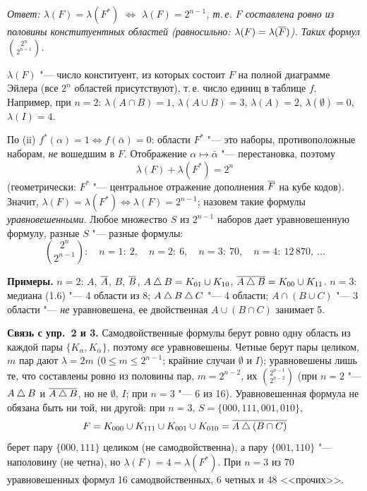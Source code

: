 \begin{solution}[7 (\S\,3)]
\emph{Ответ: $\lambda(F)=\lambda(F^*)$ $\iff$ $\lambda(F)=2^{n-1}$, т.\,е.
$F$ составлена ровно из половины конституентных областей (равносильно:
$\lambda(F)=\lambda(\overline{F})$). Таких формул $\binom{2^n}{2^{n-1}}$.}

$\lambda(F)$ "--- число конституент, из которых состоит $F$ на полной
диаграмме Эйлера (все $2^n$ областей присутствуют), т.\,е. число единиц
в таблице $f$. Например, при $n=2$: $\lambda(A\cap B)=1$,
$\lambda(A\cup B)=3$, $\lambda(A)=2$, $\lambda(\emptyset)=0$,
$\lambda(I)=4$.

По (ii) $f^*(\alpha)=1\iff f(\bar\alpha)=0$: области $F^*$ "--- это
наборы, противоположные наборам, \emph{не} вошедшим в $F$. Отображение
$\alpha\mapsto\bar\alpha$ "--- перестановка, поэтому
\[
\boxed{\;\lambda(F)+\lambda(F^*)=2^n\;}
\]
(геометрически: $F^*$ "--- центральное отражение дополнения $\overline{F}$ на кубе
кодов). Значит, $\lambda(F)=\lambda(F^*)\iff\lambda(F)=2^{n-1}$; назовем
такие формулы \emph{уравновешенными}. Любое множество $S$ из $2^{n-1}$
наборов дает уравновешенную формулу, разные $S$ "--- разные формулы:
\[
\binom{2^n}{2^{n-1}}:\quad n=1:\ 2,\quad n=2:\ 6,\quad n=3:\ 70,\quad n=4:\ 12\,870,\ \dots
\]

\textbf{Примеры.} $n=2$: $A$, $\overline{A}$, $B$, $\overline{B}$, $A\mathbin{\triangle} B=K_{01}\cup K_{10}$,
$\overline{A\mathbin{\triangle} B}=K_{00}\cup K_{11}$. $n=3$: медиана (1.6) "--- 4 области из 8;
$A\mathbin{\triangle} B\mathbin{\triangle} C$ "--- 4 области; $A\cap(B\cup C)$ "--- 3 области "--- \emph{не}
уравновешена, ее двойственная $A\cup(B\cap C)$ занимает 5.

\textbf{Связь с упр.~2 и 3.} Самодвойственные формулы берут ровно одну
область из каждой пары $\{K_\alpha,K_{\bar\alpha}\}$, поэтому \emph{все}
уравновешены. Четные берут пары целиком, $m$ пар дают $\lambda=2m$
($0\le m\le2^{n-1}$; крайние случаи $\emptyset$ и $I$); уравновешены
лишь те, что составлены ровно из половины пар, $m=2^{n-2}$, их
$\binom{2^{n-1}}{2^{n-2}}$ (при $n=2$ "--- $A\mathbin{\triangle} B$ и $\overline{A\mathbin{\triangle} B}$,
но не $\emptyset$, $I$; при $n=3$ "--- 6 из 16). Уравновешенная формула не
обязана быть ни той, ни другой: при $n=3$, $S=\{000,111,001,010\}$,
\[
F=K_{000}\cup K_{111}\cup K_{001}\cup K_{010}=\overline{A\mathbin{\triangle}(B\cap C)}
\]
берет пару $\{000,111\}$ целиком (не самодвойственна), а пару
$\{001,110\}$ "--- наполовину (не четна), но $\lambda(F)=4=\lambda(F^*)$.
При $n=3$ из 70 уравновешенных формул 16 самодвойственных, 6 четных
и 48 <<прочих>>.
\end{solution}
